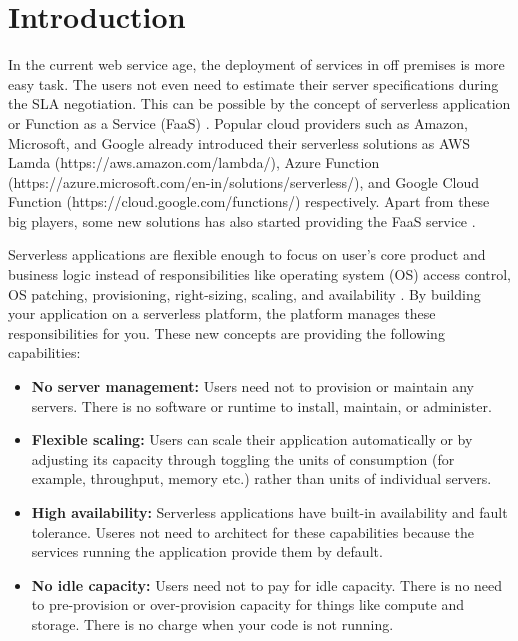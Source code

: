 \section{Introduction}\label{intro}

In the current web service age, the deployment of services in off premises is more easy task. The users not even need to estimate their server specifications during the SLA negotiation. This can be possible by the concept of serverless application or Function as a Service (FaaS) \cite{Wang_usenix_2018}. Popular cloud providers such as Amazon, Microsoft, and Google already introduced their serverless solutions as AWS Lamda (https://aws.amazon.com/lambda/), Azure Function (https://azure.microsoft.com/en-in/solutions/serverless/), and Google Cloud Function (https://cloud.google.com/functions/) respectively. Apart from these big players, some new solutions has also started providing the FaaS service \cite{servelless_online_2019}.

\noindent Serverless applications are flexible enough to focus on user's core product and business logic instead of responsibilities like operating system (OS) access control, OS patching, provisioning, right-sizing, scaling, and availability \cite{Lloyd_2018}. By building your application on a serverless platform, the platform manages these responsibilities for you. These new concepts are providing the following capabilities:
\begin{itemize}
	\item \textbf{No server management:} Users need not to provision or maintain any servers. There is no software or runtime to install, maintain, or administer.
	\item \textbf{Flexible scaling:} Users can scale their application automatically or by adjusting its capacity through toggling the units of consumption (for example, throughput, memory etc.) rather than units of individual servers.
	\item \textbf{High availability:} Serverless applications have built-in availability and fault tolerance. Useres not need to architect for these capabilities because the services running the application provide them by default.
	\item \textbf{No idle capacity:} Users need not to pay for idle capacity. There is no need to pre-provision or over-provision capacity for things like compute and storage. There is no charge when your code is not running.
\end{itemize}


